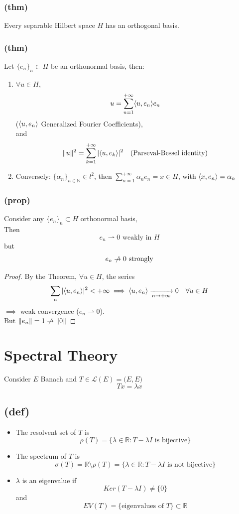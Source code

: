 \subsubsection{(thm)}
Every separable Hilbert space $H$ has an orthogonal basis.
\subsubsection{(thm)}
Let $\{e_n\}_n\subset H$ be an orthonormal basis, then:
\begin{enumerate}
    \item $\forall u\in H$, $$
    u=\sum_{n=1}^{+\infty} \langle {u} , {e_n} \rangle e_n$$
    ($\langle {u} , {e_n} \rangle $ Generalized Fourier Coefficients),\\
    and $$\Vert u\Vert ^2=\sum_{k=1}^{+\infty} |\langle {u} , {e_k} \rangle|^2 \quad \text{(Parseval-Bessel identity)}$$ 
\item Conversely: $\{ \alpha_n\}_{n\in \mathbb N}\in l^2$, then $\sum_{n=1}^{+\infty}\alpha_ne_n=x\in H$, with $\langle {x} , {e_n} \rangle=\alpha_n$
\end{enumerate}
\subsubsection{(prop)}
Consider any $\{e_n\}_n\subset H$ orthonormal basis,\\
Then
$$e_n\rightharpoonup 0 \text{ weakly in } H$$ but  $$e_n\centernot \to 0 \text{ strongly}$$
\begin{proof}
    By the Theorem, $\forall u \in H$, the series
    $$\sum_n |\langle {u} , {e_n} \rangle|^2<+\infty\implies \langle {u} , {e_n} \rangle\xrightarrow[n\to +\infty]{}0\quad \forall u\in H$$
    $\implies$ weak convergence ($e_n\rightharpoonup0$).\\
    But $\Vert e_n\Vert=1\centernot\to \Vert 0\Vert$
\end{proof}
\section{Spectral Theory}
Consider $E$ Banach and $T\in \mathcal L(E)=\mathcal (E,E)$
$$Tx=\lambda x$$
\subsection{(def)}
\begin{itemize}
    \item The resolvent set of $T$ is 
    $$\rho(T)=\{\lambda\in \mathbb R:T-\lambda I\text{ is bijective}\}$$
    \item The spectrum of $T$ is
    $$\sigma(T)=\mathbb R\setminus \rho(T)=\{\lambda \in \mathbb R: T-\lambda I\text{ is not bijective}\}$$
    \item $\lambda$ is an eigenvalue if
    $$Ker(T-\lambda I)\neq \{0\}$$
    and 
    $$EV(T)=\{\text{eigenvalues of }T\}\subset \mathbb R$$
\end{itemize}
